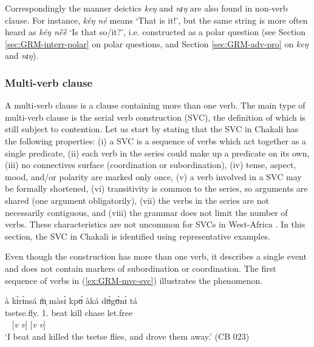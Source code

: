 Correspondingly the manner deictics {\it keŋ} and {\it  nɪŋ} are also found in 
non-verb
clause. For instance, {\it kéŋ né} means `That is it!', but the same string is
more often heard as {\it kéŋ nȅȅ} `Is that so/it?',  i.e.
constructed  as a polar question (see Section \ref{sec:GRM-interr-polar} on 
polar questions, and Section \ref{sec:GRM-adv-pro}  on  {\it keŋ} 
and
{\it  nɪŋ}).



\subsubsection{Multi-verb clause}
\label{sec:GRM-multi-verb-clause}



A multi-verb clause is a clause containing more than one verb. The main type of
multi-verb clause is the serial verb construction (SVC), the definition of which
is still subject to contention. Let us start by stating that the SVC in Chakali
has the following properties: (i) a SVC is a sequence of verbs which act
together as a single predicate, (ii) each verb in the series could make up a
predicate on its own, (iii)  no connectives  surface (coordination or
subordination), (iv)  tense, aspect, mood, and/or polarity are marked only once,
(v)  a verb involved in a SVC may be formally shortened,  (vi)  transitivity is
common to the series, so arguments are shared (one argument obligatorily), (vii)
the verbs in the series are not necessarily contiguous, and  (viii) the grammar
does not limit the number of verbs. These characteristics are not uncommon for 
SVCs in West-Africa \citep{Amek05a}. In this section, the SVC in Chakali is
identified using representative examples. 


Even though the construction has more than one
verb, it describes a single event and does not contain  markers of
subordination or coordination. The first sequence of verbs in
(\ref{ex:GRM-mvc-svc}) illustrates the phenomenon.



\ea\label{ex:GRM-mvc-svc}
\glll à     kɪ̀rɪ̀nsá      m̩̀      màsɪ̀   kpʊ́    àká    dʊ̀gʊ̀nɪ̀ tá\\
{\art}  tsetse.fly.{\pl}   {1.\sg}       beat   kill   {\conn} 
chase         let.free\\
 {} {} {}  {} [{\it v} {\it v}]  {} [{\it v} {\it v}]\\
\glt `I beat and killed the tsetse flies, and drove them away.' (CB 023)
\z

